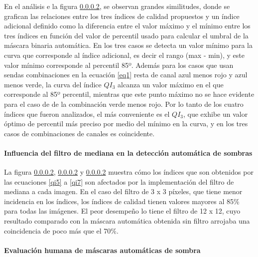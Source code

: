 En el análisis e la figura \ref{}, se observan grandes similitudes, donde se grafican las relaciones entre los tres índices de calidad propuestos y un índice adicional definido como la diferencia entre el valor máximo y el mínimo entre los tres índices en función del valor de percentil usado para calcular el umbral de la máscara binaria automática. En los tres casos se detecta un valor mínimo para la curva que corresponde al índice adicional, es decir el rango (max - min), y este valor mínimo corresponde al percentil 85º. Además para los casos que usan sendas combinaciones en la ecuación \ref{eq1} resta de canal azul menos rojo y azul menos verde, la curva del índice $QI_3$ alcanza un valor máximo en el que corresponde al 85º percentil, mientras que este punto máximo no se hace evidente para el caso de de la combinación verde menos rojo. Por lo tanto de los cuatro índices que fueron analizados, el más conveniente es el $QI_3$, que exhibe un valor óptimo de percentil más preciso por medio del mínimo en la curva, y en los tres casos de combinaciones de canales es coincidente.

\paragraph{Influencia del filtro de mediana en la detección automática de sombras}

La figura \ref{}, \ref{} y \ref{} muestra cómo los índices que son obtenidos por las ecuaciones \ref{qi5} a \ref{qi7} son afectados por la implementación del filtro de mediana a cada imagen. En el caso del filtro de 3 x 3 píxeles, que tiene menor incidencia en los índices, los índices de calidad tienen valores mayores al 85\% para todas las imágenes. El peor desempeño lo tiene el filtro de 12 x 12, cuyo resultado comparado con la máscara automática obtenida sin filtro arrojaba una coincidencia de poco más que el 70\%.

\paragraph{Evaluación humana de máscaras automáticas de sombra}

